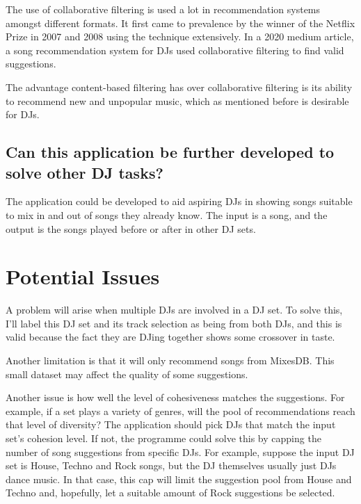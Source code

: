 \documentclass[11pt,titlepage,oneside]{book}
\begin{document}
	The use of collaborative filtering is used a lot in recommendation systems amongst different formats. It first came to prevalence by the winner of the Netflix Prize in 2007 and 2008 using the technique extensively\citep{zhou_large-scale_2008}. In a 2020 medium article, a song recommendation system for DJs used collaborative filtering to find valid suggestions\citep{chow_music_2020}.
	
	\begin{flushleft}
		The advantage content-based filtering has over collaborative filtering is its ability to recommend new and unpopular music, which as mentioned before is desirable for DJs\citep{van_den_oord_deep_2013}.
	\end{flushleft}
	
	
	\subsection{Can this application be further developed to solve other DJ tasks?}
	The application could be developed to aid aspiring DJs in showing songs suitable to mix in and out of songs they already know. The input is a song, and the output is the songs played before or after in other DJ sets.
	
\section{Potential Issues}
A problem will arise when multiple DJs are involved in a DJ set. To solve this, I'll label this DJ set and its track selection as being from both DJs, and this is valid because the fact they are DJing together shows some crossover in taste.

\begin{flushleft}
	Another limitation is that it will only recommend songs from MixesDB. This small dataset may affect the quality of some suggestions.
\end{flushleft}

\begin{flushleft}
	Another issue is how well the level of cohesiveness matches the suggestions. For example, if a set plays a variety of genres, will the pool of recommendations reach that level of diversity? The application should pick DJs that match the input set's cohesion level. If not, the programme could solve this by capping the number of song suggestions from specific DJs. For example, suppose the input DJ set is House, Techno and Rock songs, but the DJ themselves usually just DJs dance music. In that case, this cap will limit the suggestion pool from House and Techno and, hopefully, let a suitable amount of Rock suggestions be selected. 
\end{flushleft}
\end{document}
